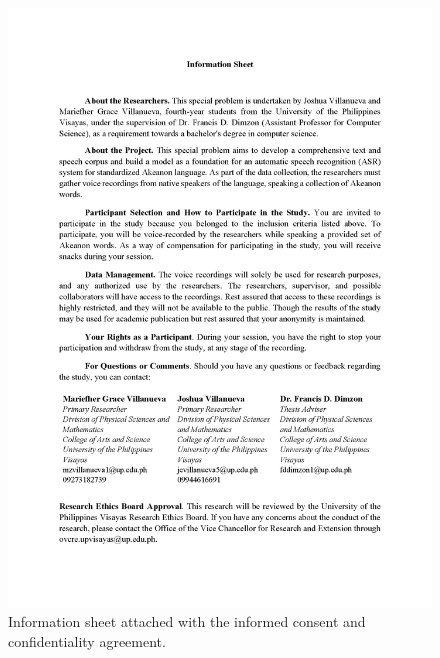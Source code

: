 \begin{figure}[h!]
    \centering
    \includegraphics[width=\textwidth]{./appendix/letters_Page_4.png}
    \caption{Information sheet attached with the informed consent and confidentiality agreement.}
    \label{fig:infoSheet}
\end{figure}
